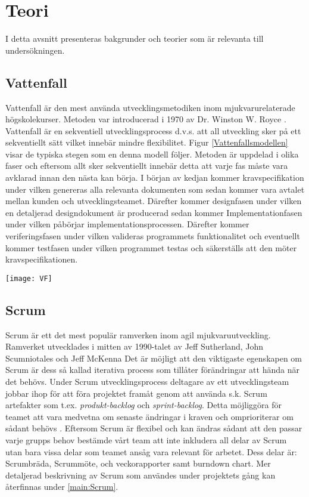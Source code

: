 \section{Teori} \label{sec:Lieth_Wahid-theory}
I detta avsnitt presenteras bakgrunder och teorier som är relevanta till undersökningen. 
\subsection{Vattenfall}
Vattenfall är den mest använda utvecklingsmetodiken inom mjukvarurelaterade högskolekurser. Metoden var introducerad i 1970 \cite{WaterfalM} av Dr. Winston W. Royce \cite{royce1987managing}. Vattenfall är en sekventiell utvecklingsprocess d.v.s. att all utveckling sker på ett sekventiellt sätt vilket innebär mindre flexibilitet. Figur \ref{Vattenfallsmodellen} visar de typiska 
stegen som en denna modell följer. Metoden är uppdelad i olika faser och eftersom allt sker sekventiellt innebär detta att varje fas måste vara avklarad innan den nästa kan börja.  I början av kedjan kommer kravspecifikation under vilken genereras alla relevanta dokumenten som sedan kommer vara avtalet mellan kunden och utvecklingsteamet\cite{ASEEPEER95:online,}. Därefter kommer designfasen under vilken en detaljerad designdokument är producerad sedan kommer Implementationfasen under vilken påbörjar implementationsprocessen. Därefter kommer veriferingsfasen under vilken valideras programmets funktionalitet och eventuellt kommer testfasen under vilken programmet testas och säkerställs att den möter kravspecifikationen.
\begin{figure*}[h]
	\centering
	\texttt{[image: VF]}
	\caption{Vattenfallsmodellen}
	\label{Vattenfallsmodellen}
\end{figure*}
\subsection{Scrum}
Scrum är ett det mest populär ramverken inom agil mjukvaruutveckling. Ramverket utvecklades i mitten av 1990-talet av Jeff Sutherland, John Scumniotales och Jeff McKenna Det är möjligt att den viktigaste egenskapen om Scrum är dess så kallad iterativa process som tillåter förändringar att hända när det behövs. Under Scrum utvecklingsprocess deltagare av ett utvecklingsteam jobbar ihop för att föra projektet framåt genom att använda s.k. Scrum artefakter som t.ex. \textit{produkt-backlog} och \textit{sprint-backlog}. Detta möjliggöra för teamet att vara medvetna om senaste ändringar i kraven och omprioriterar om sådant behövs \cite{aamir2017incorporating}. Eftersom Scrum är flexibel och kan ändras sådant att den passar varje grupps behov bestämde vårt team att inte inkludera all delar av Scrum utan bara vissa delar som teamet ansåg vara relevant för arbetet. Dess delar är:
Scrumbräda, Scrummöte, och veckorapporter samt burndown chart. Mer detaljerad beskrivning av Scrum som användes under projektets gång kan återfinnas under
\ref{main:Scrum}.
